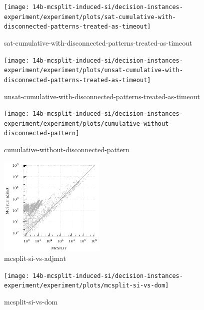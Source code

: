 \begin{figure}[h!]
    \centering
    \texttt{[image: 14b-mcsplit-induced-si/decision-instances-experiment/experiment/plots/sat-cumulative-with-disconnected-patterns-treated-as-timeout]}
    \caption{sat-cumulative-with-disconnected-patterns-treated-as-timeout}
    \label{figure:sat-cumulative-with-disconnected-patterns-treated-as-timeout}
\end{figure}

\begin{figure}[h!]
    \centering
    \texttt{[image: 14b-mcsplit-induced-si/decision-instances-experiment/experiment/plots/unsat-cumulative-with-disconnected-patterns-treated-as-timeout]}
    \caption{unsat-cumulative-with-disconnected-patterns-treated-as-timeout}
    \label{figure:unsat-cumulative-with-disconnected-patterns-treated-as-timeout}
\end{figure}

\begin{figure}[h!]
    \centering
    \texttt{[image: 14b-mcsplit-induced-si/decision-instances-experiment/experiment/plots/cumulative-without-disconnected-pattern]}
    \caption{cumulative-without-disconnected-pattern}
    \label{figure:cumulative-without-disconnected-pattern}
\end{figure}

\begin{figure}[h!]
    \centering
    \includegraphics*[width=0.45\textwidth]{14b-mcsplit-induced-si/decision-instances-experiment/experiment/plots/mcsplit-si-vs-adjmat}
    \caption{mcsplit-si-vs-adjmat}
    \label{figure:mcsplit-si-vs-adjmat}
\end{figure}

\begin{figure}[h!]
    \centering
    \texttt{[image: 14b-mcsplit-induced-si/decision-instances-experiment/experiment/plots/mcsplit-si-vs-dom]}
    \caption{mcsplit-si-vs-dom}
    \label{figure:mcsplit-si-vs-dom}
\end{figure}

